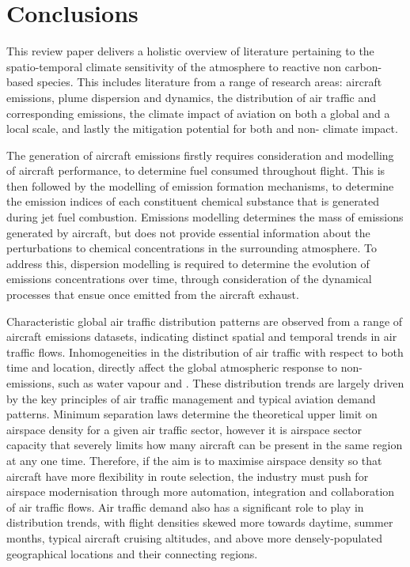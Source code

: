 \section{Conclusions}
This review paper delivers a holistic overview of literature pertaining to the spatio-temporal climate sensitivity of the atmosphere to reactive non carbon-based species. This includes literature from a range of research areas: aircraft emissions, plume dispersion and dynamics, the distribution of air traffic and corresponding emissions, the climate impact of aviation on both a global and a local scale, and lastly the mitigation potential for both  and non- climate impact. 

The generation of aircraft emissions firstly requires consideration and modelling of aircraft performance, to determine fuel consumed throughout flight. This is then followed by the modelling of emission formation mechanisms, to determine the emission indices of each constituent chemical substance that is generated during jet fuel combustion. Emissions modelling determines the mass of emissions generated by aircraft, but does not provide essential information about the perturbations to chemical concentrations in the surrounding atmosphere. To address this, dispersion modelling is required to determine the evolution of emissions concentrations over time, through consideration of the dynamical processes that ensue once emitted from the aircraft exhaust. 

Characteristic global air traffic distribution patterns are observed from a range of aircraft emissions datasets, indicating distinct spatial and temporal trends in air traffic flows. Inhomogeneities in the distribution of air traffic with respect to both time and location, directly affect the global atmospheric response to non- emissions, such as water vapour and . These distribution trends are largely driven by the key principles of air traffic management and typical aviation demand patterns. Minimum separation laws determine the theoretical upper limit on airspace density for a given air traffic sector, however it is airspace sector capacity that severely limits how many aircraft can be present in the same region at any one time. Therefore, if the aim is to maximise airspace density so that aircraft have more flexibility in route selection, the industry must push for airspace modernisation through more automation, integration and collaboration of air traffic flows. Air traffic demand also has a significant role to play in distribution trends, with flight densities skewed more towards daytime, summer months, typical aircraft cruising altitudes, and above more densely-populated geographical locations and their connecting regions.


